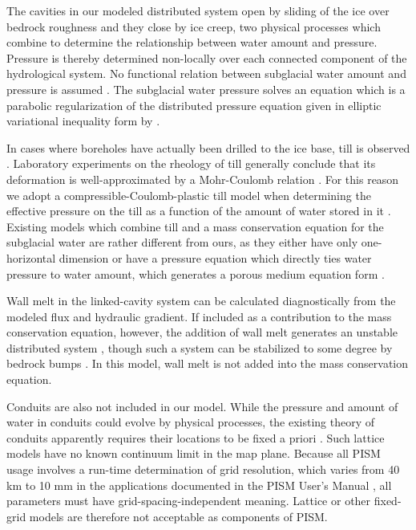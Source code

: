 \documentclass[gmd]{copernicus}   %
\begin{document}
The cavities in our modeled distributed system open by sliding of the ice over bedrock roughness and they close by ice creep, two physical processes which combine to determine the relationship between water amount and pressure.  Pressure is thereby determined non-locally over each connected component of the hydrological system.  No functional relation between subglacial water amount and pressure is assumed \citep[compare][]{FlowersClarke2002_theory}.  The subglacial water pressure solves an equation which is a parabolic regularization of the distributed pressure equation given in elliptic variational inequality form by \cite{Schoofetal2012}.

In cases where boreholes have actually been drilled to the ice base, till is observed \citep{Hookeetal1997,Tulaczyketal2000,TrufferHarrisonEchelmeyer2000,TrufferHarrison2006}.  Laboratory experiments on the rheology of till \citep{Kamb1991,Hookeetal1997,Tulaczyketal2000,TrufferEchelmeyerHarrison2001} generally conclude that its deformation is well-approximated by a Mohr-Coulomb relation \citep{SchoofTill}.  For this reason we adopt a compressible-Coulomb-plastic till model when determining the effective pressure on the till as a function of the amount of water stored in it \citep{Tulaczyketal2000}.  Existing models which combine till and a mass conservation equation for the subglacial water are rather different from ours, as they either have only one-horizontal dimension \citep{vanderWeletal2013} or have a pressure equation which directly ties water pressure to water amount, which generates a porous medium equation form \citep{FlowersClarke2002_theory,deFleurianetal2014}.

Wall melt in the linked-cavity system can be calculated diagnostically from the modeled flux and hydraulic gradient.  If included as a contribution to the mass conservation equation, however, the addition of wall melt generates an unstable distributed system \citep{Walder1982}, though such a system can be stabilized to some degree by bedrock bumps \citep{CreytsSchoof2009}.  In this model, wall melt is not added into the mass conservation equation.

Conduits are also not included in our model.  While the pressure and amount of water in conduits could evolve by physical processes, the existing theory of conduits apparently requires their locations to be fixed a priori \citep{Schoofmeltsupply,PimentelFlowers2011,Hewittetal2012,Hewitt2013,Werderetal2013}.  Such lattice models have no known continuum limit in the map plane.  Because all PISM usage involves a run-time determination of grid resolution, which varies from 40 km to 10 mm in the applications documented in the PISM User's Manual \citep{pism-user-manual}, all parameters must have grid-spacing-independent meaning.  Lattice or other fixed-grid models are therefore not acceptable as components of PISM.
\end{document}
